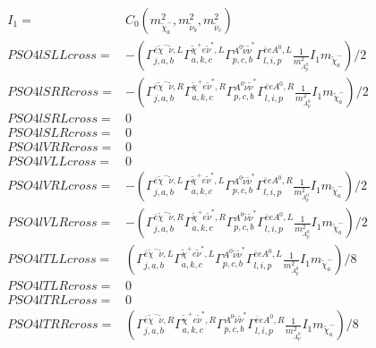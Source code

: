 \documentclass[A4,landscape]{article}
\begin{document}
\begin{align} 
I_1= & C_0(m^2_{\tilde{\chi}^-_{{a}}}, m^2_{\tilde{\nu}_{{b}}}, m^2_{\tilde{\nu}_{{c}}}) \\ 
  PSO4lSLLcross= & -( \Gamma^{\bar{e}\tilde{\chi}^- \tilde{\nu} ,L}_{j, a, b} \Gamma^{\tilde{\chi}^+e \tilde{\nu}^*,L}_{a, k, c} \Gamma^{A^0 \tilde{\nu} \tilde{\nu}^*}_{p, c, b} \Gamma^{\bar{e}e A^0 ,L}_{l, i, p} \frac{1}{m^2_{A^0_{{p}}}} I_1 m_{\tilde{\chi}^-_{{a}}})/2 \\ 
  PSO4lSRRcross= & -( \Gamma^{\bar{e}\tilde{\chi}^- \tilde{\nu} ,R}_{j, a, b} \Gamma^{\tilde{\chi}^+e \tilde{\nu}^*,R}_{a, k, c} \Gamma^{A^0 \tilde{\nu} \tilde{\nu}^*}_{p, c, b} \Gamma^{\bar{e}e A^0 ,R}_{l, i, p} \frac{1}{m^2_{A^0_{{p}}}} I_1 m_{\tilde{\chi}^-_{{a}}})/2 \\ 
  PSO4lSRLcross= & 0 \\ 
  PSO4lSLRcross= & 0 \\ 
  PSO4lVRRcross= & 0 \\ 
  PSO4lVLLcross= & 0 \\ 
  PSO4lVRLcross= & -( \Gamma^{\bar{e}\tilde{\chi}^- \tilde{\nu} ,L}_{j, a, b} \Gamma^{\tilde{\chi}^+e \tilde{\nu}^*,L}_{a, k, c} \Gamma^{A^0 \tilde{\nu} \tilde{\nu}^*}_{p, c, b} \Gamma^{\bar{e}e A^0 ,R}_{l, i, p} \frac{1}{m^2_{A^0_{{p}}}} I_1 m_{\tilde{\chi}^-_{{a}}})/2 \\ 
  PSO4lVLRcross= & -( \Gamma^{\bar{e}\tilde{\chi}^- \tilde{\nu} ,R}_{j, a, b} \Gamma^{\tilde{\chi}^+e \tilde{\nu}^*,R}_{a, k, c} \Gamma^{A^0 \tilde{\nu} \tilde{\nu}^*}_{p, c, b} \Gamma^{\bar{e}e A^0 ,L}_{l, i, p} \frac{1}{m^2_{A^0_{{p}}}} I_1 m_{\tilde{\chi}^-_{{a}}})/2 \\ 
  PSO4lTLLcross= & ( \Gamma^{\bar{e}\tilde{\chi}^- \tilde{\nu} ,L}_{j, a, b} \Gamma^{\tilde{\chi}^+e \tilde{\nu}^*,L}_{a, k, c} \Gamma^{A^0 \tilde{\nu} \tilde{\nu}^*}_{p, c, b} \Gamma^{\bar{e}e A^0 ,L}_{l, i, p} \frac{1}{m^2_{A^0_{{p}}}} I_1 m_{\tilde{\chi}^-_{{a}}})/8 \\ 
  PSO4lTLRcross= & 0 \\ 
  PSO4lTRLcross= & 0 \\ 
  PSO4lTRRcross= & ( \Gamma^{\bar{e}\tilde{\chi}^- \tilde{\nu} ,R}_{j, a, b} \Gamma^{\tilde{\chi}^+e \tilde{\nu}^*,R}_{a, k, c} \Gamma^{A^0 \tilde{\nu} \tilde{\nu}^*}_{p, c, b} \Gamma^{\bar{e}e A^0 ,R}_{l, i, p} \frac{1}{m^2_{A^0_{{p}}}} I_1 m_{\tilde{\chi}^-_{{a}}})/8 \\ 
\end{align} 
\end{document}
